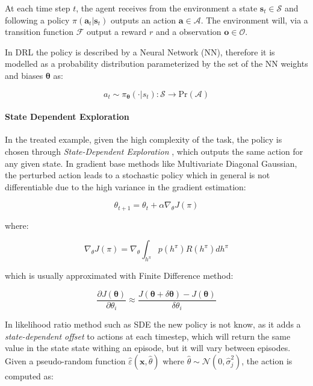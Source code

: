 At each time step $t$, the agent receives from the environment a state $\mathbf{s}_t \in \mathcal{S}$ and following a policy $\pi (\mathbf{a}_t | \mathbf{s}_t)$ outputs an action $\mathbf{a} \in \mathcal{A}$. The environment will, via a transition function $\mathcal{F}$ output a reward $r$ and a observation $\mathbf{o} \in \mathcal{O}$.

In \ac{DRL} the policy is described by a Neural Network (\ac{NN}), therefore it is modelled as a probability distribution parameterized by the set of the \ac{NN} weights and biases $\boldsymbol{\theta}$ as:

\begin{equation}
    a _t \sim \pi _{\boldsymbol{\theta}}(\cdot | s_t): \mathcal{S} \rightarrow \mathrm{Pr}(\mathcal{A})
\end{equation}

\paragraph{State Dependent Exploration} In the treated example, given the high complexity of the task, the policy is chosen through \textit{State-Dependent Exploration} \citep{daelemans_state-dependent_2008, raffin_smooth_2021}, which outputs the same action for any given state. In gradient base methods like Multivariate Diagonal Gaussian, the perturbed action leads to a stochastic policy which in general is not differentiable due to the high variance in the gradient estimation:

\begin{equation}
    \theta _{t+1} = \theta _t + \alpha \nabla _{\theta} J(\pi)
\end{equation}

where:

\begin{equation}
    \nabla _{\theta} J(\pi) = \nabla _{\theta} \int _{h ^{\pi}} p(h ^{\pi})R(h ^{\pi})dh ^{\pi}
\end{equation}

which is usually approximated with Finite Difference method:

\begin{equation}
    \label{eqn:finitediff}
    \frac{\partial J(\boldsymbol{\theta})}{\partial \theta _i} \approx \frac{J(\boldsymbol{\theta} + \delta \boldsymbol{\theta}) - J(\boldsymbol{\theta})}{\delta \theta _i}
\end{equation}

In likelihood ratio method such as \ac{SDE} the new policy is not know, as it adds a \textit{state-dependent offset} to actions at each timestep, which will return the same value in the state state withing an episode, but it will vary between episodes. Given a pseudo-random function $\hat{\varepsilon}(\mathbf{x}, \hat{\theta})$ where $\hat{\theta} \sim \mathcal{N}(0, \hat{\sigma} _j ^2)$, the action is computed as:

